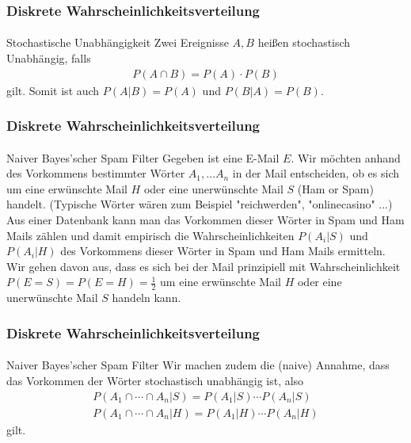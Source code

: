 \documentclass{beamer}
\begin{document}
\begin{frame}
    \frametitle{Diskrete Wahrscheinlichkeitsverteilung}
\framesubtitle{}

\begin{block}{Stochastische Unabhängigkeit}
Zwei Ereignisse $A,B$ heißen stochastisch Unabhängig, falls
\begin{align*}
P(A \cap B) = P(A) \cdot P(B)
\end{align*}
gilt.  Somit ist auch $P(A | B) = P(A)$ und $P(B  | A) = P(B)$.
\end{block}



 \end{frame}


\begin{frame}
    \frametitle{Diskrete Wahrscheinlichkeitsverteilung}
\framesubtitle{}

\begin{block}{Naiver Bayes'scher Spam Filter}
Gegeben ist eine E-Mail $E$.  Wir möchten anhand des Vorkommens bestimmter Wörter $A_1, \ldots A_n$ in der Mail entscheiden, ob es sich um eine erwünschte Mail $H$ oder eine unerwünschte Mail $S$ (Ham or Spam) handelt. 
(Typische Wörter wären zum Beispiel "reichwerden",  "onlinecasino" ...)
Aus einer Datenbank kann man das Vorkommen dieser Wörter in Spam und Ham Mails zählen und damit empirisch die Wahrscheinlichkeiten $P(A_i | S)$ und $P(A_i | H) $ des Vorkommens dieser Wörter in Spam und Ham Mails ermitteln.  Wir gehen davon aus, dass es sich bei der Mail  prinzipiell mit  Wahrscheinlichkeit $P(E= S) = P(E= H)= \frac{1}{2}$  um eine erwünschte  Mail $H$ oder eine unerwünschte Mail $S$  handeln kann. 
\end{block}



 \end{frame}


\begin{frame}
    \frametitle{Diskrete Wahrscheinlichkeitsverteilung}
\framesubtitle{}

\begin{block}{Naiver Bayes'scher Spam Filter}
 Wir machen zudem die (naive) Annahme, dass das Vorkommen der Wörter  stochastisch unabhängig ist, also 
\begin{align*}
P(A_1 \cap \cdots \cap A_n | S) = P(A_1 | S) \cdots P(A_n | S) \\
P(A_1 \cap \cdots \cap A_n | H) = P(A_1 | H) \cdots P(A_n | H)
\end{align*}
gilt.
\end{block}

 \end{frame}
\end{document}
